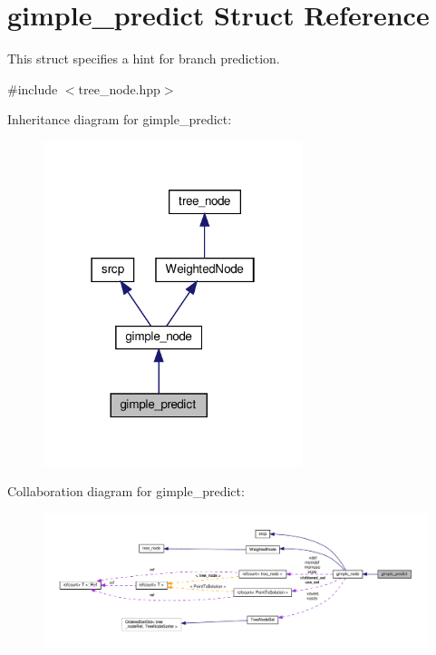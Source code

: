 \hypertarget{structgimple__predict}{}\section{gimple\+\_\+predict Struct Reference}
\label{structgimple__predict}


This struct specifies a hint for branch prediction.  




{\ttfamily \#include $<$tree\+\_\+node.\+hpp$>$}



Inheritance diagram for gimple\+\_\+predict\+:
\nopagebreak
\begin{figure}[H]
\begin{center}
\leavevmode
\includegraphics[width=214pt]{d6/dc4/structgimple__predict__inherit__graph}
\end{center}
\end{figure}


Collaboration diagram for gimple\+\_\+predict\+:
\nopagebreak
\begin{figure}[H]
\begin{center}
\leavevmode
\includegraphics[width=350pt]{d4/daa/structgimple__predict__coll__graph}
\end{center}
\end{figure}

